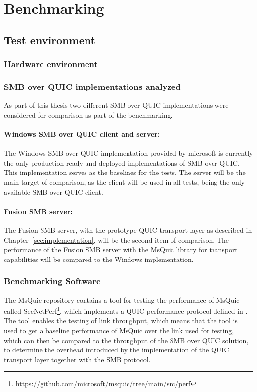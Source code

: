 \documentclass[english, 12pt, a4paper, elec, utf8, a-2b, online]{aaltothesis}
\begin{document}
\clearpage
\section{Benchmarking}
\label{sec:benchmark}
\subsection{Test environment}

\subsubsection{Hardware environment}

\subsubsection{SMB over QUIC implementations analyzed}
As part of this thesis two different SMB over QUIC implementations were considered
for comparison as part of the benchmarking.
\paragraph{Windows SMB over QUIC client and server:}

The Windows SMB over QUIC implementation provided by microsoft is currently
the only production-ready and deployed implementations of SMB over QUIC. This implementation
serves as the baselines for the tests. The server will be the main target of comparison,
as the client will be used in all tests, being the only available SMB over QUIC client.

\paragraph{Fusion SMB server:}

The Fusion SMB server, with the prototype QUIC transport layer as described in
Chapter~\ref{sec:implementation}, will be the second item of comparison. The performance
of the Fusion SMB server with the MsQuic library for transport capabilities will
be compared to the Windows implementation.

\subsubsection{Benchmarking Software}
The MsQuic repository contains a tool for testing the performance of MsQuic called
SecNetPerf\footnote{\url{https://github.com/microsoft/msquic/tree/main/src/perf}},
which implements a QUIC performance protocol defined in \cite{banks-quic-performance-00}.
The tool enables the testing of link throughput, which means that the tool is used
to get a baseline performance of MsQuic over the link used for testing, which can then
be compared to the throughput of the SMB over QUIC solution, to determine the overhead
introduced by the implementation of the QUIC transport layer together with the SMB protocol.
\end{document}
